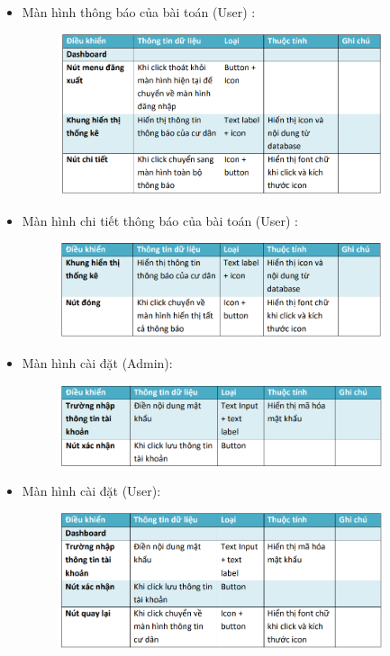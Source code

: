 \documentclass{article}
\begin{document}
\begin{itemize}
    \item Màn hình thông báo của bài toán (User) :
    \begin{figure}[H]
        \centering
        \includegraphics[width=0.9\textwidth]{Ảnh chương 4/Thông báo User.png}
    \end{figure}
    \item Màn hình chi tiết thông báo của bài toán (User) :
    \begin{figure}[H]
        \centering
        \includegraphics[width=0.9\textwidth]{Ảnh chương 4/Chi tiết thông báo.png}
    \end{figure}
    \vspace{3cm}
    \item Màn hình cài đặt (Admin):
    \begin{figure}[H]
        \centering
        \includegraphics[width=0.9\textwidth]{Ảnh chương 4/Cài đặt Admin.png}
    \end{figure}
    \item Màn hình cài đặt (User):
    \begin{figure}[H]
        \centering
        \includegraphics[width=0.9\textwidth]{Ảnh chương 4/Cài đặt User.png}
    \end{figure}
\end{itemize}
\newpage
\end{document}
